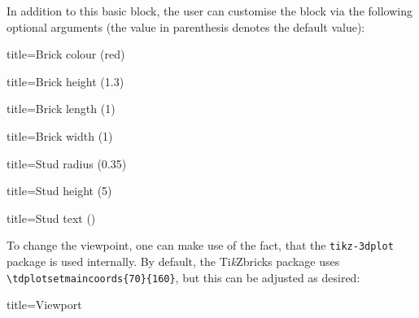 \documentclass[parskip=half]{scrartcl}
\newcommand{\tikzbrick}{Ti\emph{k}Zbrick\xspace}
\begin{document}
In addition to this basic block, the user can customise the block via the following optional arguments (the value in parenthesis denotes the default value):
\begin{tcblisting}{title={Brick colour (red)}}
\end{tcblisting}
\begin{tcblisting}{title={Brick height (1.3)}}
\end{tcblisting}
\begin{tcblisting}{title={Brick length (1)}}
\end{tcblisting}
\begin{tcblisting}{title={Brick width (1)}}
\end{tcblisting}
\begin{tcblisting}{title={Stud radius (0.35)}}
\end{tcblisting}
\begin{tcblisting}{title={Stud height (5)}}
\end{tcblisting}
\begin{tcblisting}{title={Stud text ()}}
\end{tcblisting}

\newpage
To change the viewpoint, one can make use of the fact, that the \texttt{tikz-3dplot} package is used internally. By default, the \tikzbrick{}s package uses \lstinline|\tdplotsetmaincoords{70}{160}|, but this can be adjusted as desired:
\begin{tcblisting}{title={Viewport}}
\end{tcblisting}
\end{document}
